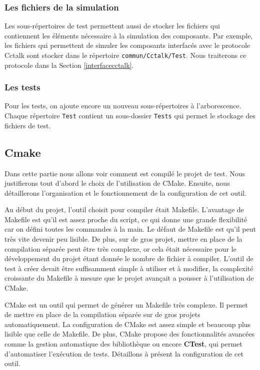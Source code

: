 \documentclass[a4paper]{article}
\begin{document}
\subsubsection{Les fichiers de la simulation}

Les sous-répertoires de test permettent aussi de stocker les fichiers qui
contiennent les éléments nécessaire à la simulation des composants. Par exemple,
les fichiers qui permettent de simuler les composants interfacés avec le
protocole Cctalk sont stocker dans le répertoire \verb|commun/Cctalk/Test|. Nous
traiterons ce protocole dans la Section \ref{interfacecctalk}.

\subsubsection{Les tests}

Pour les tests, on ajoute encore un nouveau sous-répertoires à l'arborescence.
Chaque répertoire \verb|Test| contient un sous-dossier \verb|Tests| qui permet le
stockage des fichiers de test.

\subsection{Cmake}
\label{cmake}

Dans cette partie nous allons voir comment est compilé le projet de test. Nous
justifierons tout d'abord le choix de l'utilisation de CMake. Ensuite, nous
détaillerons l'organisation et le fonctionnement de la configuration de cet
outil.

Au début du projet, l'outil choisit pour compiler était Makefile. L'avantage de
Makefile est qu'il est assez proche du script, ce qui donne une grande
flexibilité car on défini toutes les commandes à la main. Le défaut de Makefile
est qu'il peut très vite devenir peu lisible. De plus, sur de gros projet, mettre
en place de la compilation séparée peut être très complexe, or cela était
nécessaire pour le développement du projet étant donnée le nombre de fichier à
compiler. L'outil de test à créer devait être suffisamment simple à utiliser et à
modifier, la complexité croissante du Makefile à mesure que le projet avançait a
pousser à l'utilisation de CMake.

CMake est un outil qui permet de générer un Makefile très complexe. Il permet de
mettre en place de la compilation séparée sur de gros projets automatiquement.
La configuration de CMake est assez simple et beaucoup plus lisible que celle de
Makefile. De plus, CMake propose des fonctionnalités avancées comme la gestion
automatique des bibliothèque ou encore \textbf{CTest}, qui permet d'automatiser
l'exécution de tests. Détaillons à présent la configuration de cet outil.
\end{document}
